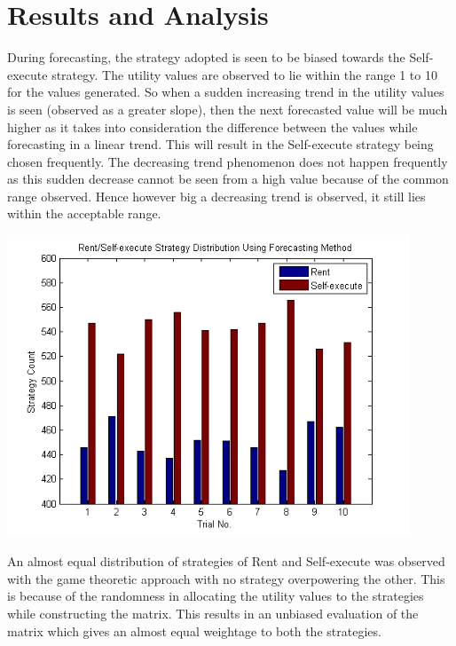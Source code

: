 \section{Results and Analysis}
During forecasting, the strategy adopted is seen to be biased towards the Self-execute strategy. The utility values are observed to lie within the range 1 to 10 for the values generated. So when a sudden increasing trend in the utility values is seen (observed as a greater slope), then the next forecasted value will be much higher as it takes into consideration the difference between the values while forecasting in a linear trend. This will result in the Self-execute strategy being chosen frequently. The decreasing trend phenomenon does not happen frequently as this sudden decrease cannot be seen from a high value because of the common range observed. Hence however big a decreasing trend is observed, it still lies within the acceptable range. \\[0.3cm]
\begin{center}
\includegraphics[width=0.9\textwidth]{forecasting1}\\[0.3cm]
\end{center}
An almost equal distribution of strategies of Rent and Self-execute was observed with the game theoretic approach with no strategy overpowering the other. This is because of the randomness in allocating the utility values to the strategies while constructing the matrix. This results in an unbiased evaluation of the matrix which gives an almost equal weightage to both the strategies.
